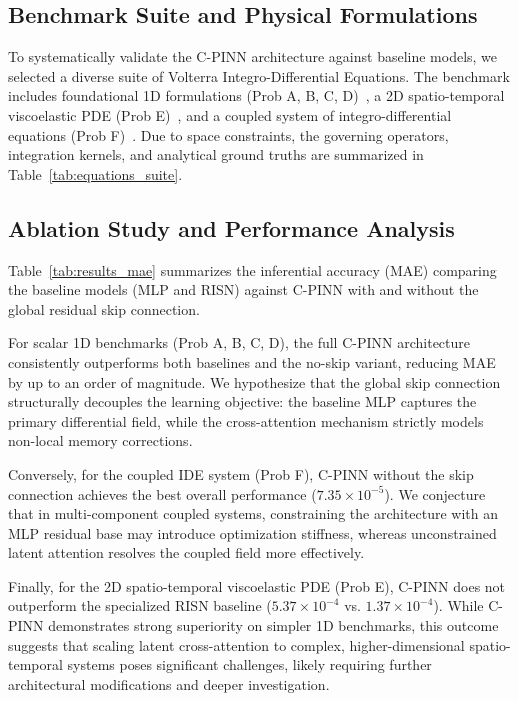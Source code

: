 \subsection{Benchmark Suite and Physical Formulations}
To systematically validate the C-PINN architecture against baseline models, we selected a diverse suite of Volterra Integro-Differential Equations. The benchmark includes foundational 1D formulations (Prob A, B, C, D)~\cite{moghaddam2025risn}, a 2D spatio-temporal viscoelastic PDE (Prob E)~\cite{Jang_2026}, and a coupled system of integro-differential equations (Prob F)~\cite{moghaddam2025risn}. Due to space constraints, the governing operators, integration kernels, and analytical ground truths are summarized in Table~\ref{tab:equations_suite}.

\subsection{Ablation Study and Performance Analysis}
Table~\ref{tab:results_mae} summarizes the inferential accuracy (MAE) comparing the baseline models (MLP and RISN) against C-PINN with and without the global residual skip connection.

For scalar 1D benchmarks (Prob A, B, C, D), the full C-PINN architecture consistently outperforms both baselines and the no-skip variant, reducing MAE by up to an order of magnitude. We hypothesize that the global skip connection structurally decouples the learning objective: the baseline MLP captures the primary differential field, while the cross-attention mechanism strictly models non-local memory corrections.

Conversely, for the coupled IDE system (Prob F), C-PINN without the skip connection achieves the best overall performance ($7.35 \times 10^{-5}$). We conjecture that in multi-component coupled systems, constraining the architecture with an MLP residual base may introduce optimization stiffness, whereas unconstrained latent attention resolves the coupled field more effectively.

Finally, for the 2D spatio-temporal viscoelastic PDE (Prob E), C-PINN does not outperform the specialized RISN baseline ($5.37 \times 10^{-4}$ vs. $1.37 \times 10^{-4}$). While C-PINN demonstrates strong superiority on simpler 1D benchmarks, this outcome suggests that scaling latent cross-attention to complex, higher-dimensional spatio-temporal systems poses significant challenges, likely requiring further architectural modifications and deeper investigation.

